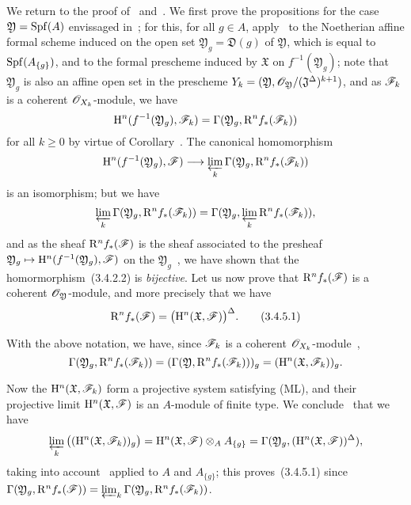 \begin{env}[3.4.5]
\label{3.3.4.5}
We return to the proof of~ and~.
We first prove the propositions for the case $\mathfrak{Y}=\operatorname{Spf}(A)$ envissaged in~; for this, for all $g\in A$, apply~ to the Noetherian affine formal scheme induced on the open set $\mathfrak{Y}_g=\mathfrak{D}(g)$ of $\mathfrak{Y}$, which is equal to $\operatorname{Spf}(A_{\{g\}})$, and to the formal prescheme induced by $\mathfrak{X}$ on $f^{-1}(\mathfrak{Y}_g)$; note that $\mathfrak{Y}_g$ is also an affine open set in the prescheme $Y_k=(\mathfrak{Y},\mathscr{O}_\mathfrak{Y}/(\mathfrak{J}^\Delta)^{k+1})$, and as $\mathscr{F}_k$ is a coherent $\mathscr{O}_{X_k}$-module, we have
\[
  \mathrm{H}^n(f^{-1}(\mathfrak{Y}_g),\mathscr{F}_k)=\Gamma(\mathfrak{Y}_g,\mathrm{R}^n f_*(\mathscr{F}_k))
\]
for all $k\geq 0$ by virtue of Corollary~.
The canonical homomorphism
\[
  \HH^n(f^{-1}(\mathfrak{Y}_g),\sh{F})\to\varprojlim_k\Gamma(\mathfrak{Y}_g,\RR^n f_*(\sh{F}_k))
\]
is an isomorphism; but we have~
\[
  \varprojlim_k\Gamma(\mathfrak{Y}_g,\mathrm{R}^n f_*(\mathscr{F}_k))=\Gamma(\mathfrak{Y}_g,\varprojlim_k\mathrm{R}^n f_*(\mathscr{F}_k)),
\]
and as the sheaf $\mathrm{R}^n f_*(\mathscr{F})$ is the sheaf associated to the presheaf $\mathfrak{Y}_g\mapsto\HH^n(f^{-1}(\mathfrak{Y}_g),\sh{F})$ on the $\mathfrak{Y}_g$~, we have shown that the homormorphism~(3.4.2.2) is \emph{bijective}.
Let us now prove that $\mathrm{R}^n f_*(\mathscr{F})$ is a coherent $\mathscr{O}_\mathfrak{Y}$-module, and more precisely that we have
\[
\label{eq:3.3.4.5.1}
  \mathrm{R}^n f_*(\mathscr{F})=\big(\mathrm{H}^n(\mathfrak{X},\mathscr{F})\big)^\Delta.
  \tag{3.4.5.1}
\]

With the above notation, we have, since $\mathscr{F}_k$ is a coherent $\mathscr{O}_{X_k}$-module~,
\[
  \Gamma(\mathfrak{Y}_g,\mathrm{R}^n f_*(\mathscr{F}_k))=(\Gamma(\mathfrak{Y},\mathrm{R}^n f_*(\mathscr{F}_k)))_g=(\mathrm{H}^n(\mathfrak{X},\mathscr{F}_k))_g.
\]

Now the $\mathrm{H}^n(\mathfrak{X},\mathscr{F}_k)$ form a projective system satisfying (ML), and their projective limit $\mathrm{H}^n(\mathfrak{X},\mathscr{F})$ is an $A$-module of finite type.
We conclude~ that we have
\[
  \varprojlim_k\big((\mathrm{H}^n(\mathfrak{X},\mathscr{F}_k))_g\big)=\mathrm{H}^n(\mathfrak{X},\mathscr{F})\otimes_A A_{\{g\}}=\Gamma(\mathfrak{Y}_g,(\mathrm{H}^n(\mathfrak{X},\mathscr{F}))^\Delta),
\]
taking into account~ applied to $A$ and $A_{\{g\}}$; this proves~(3.4.5.1) since $\Gamma(\mathfrak{Y}_g,\mathrm{R}^n f_*(\mathscr{F}))=\varprojlim_k\Gamma(\mathfrak{Y}_g,\mathrm{R}^n f_*(\mathscr{F}_k))$.


\end{env}
